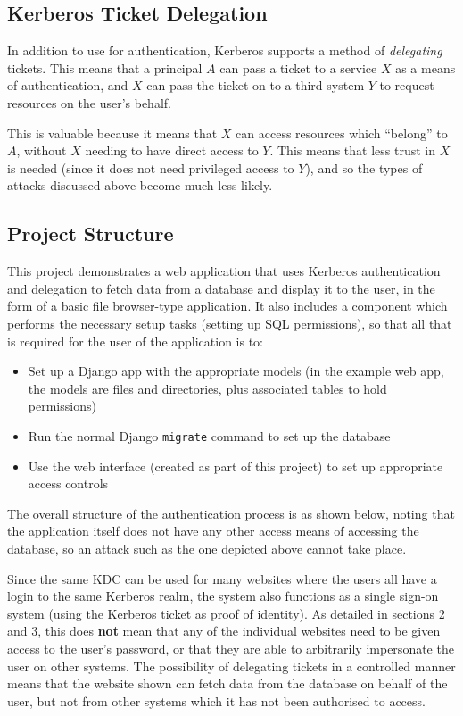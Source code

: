 \documentclass{article}
\begin{document}
\subsection{Kerberos Ticket Delegation}
In addition to use for authentication, Kerberos supports a method of \textit{delegating} tickets. This means that a principal $A$ can pass a ticket to a service $X$ as a means of authentication, and $X$ can pass the ticket on to a third system $Y$ to request resources on the user's behalf.

This is valuable because it means that $X$ can access resources which ``belong'' to $A$, without $X$ needing to have direct access to $Y$. This means that less trust in $X$ is needed (since it does not need privileged access to $Y$), and so the types of attacks discussed above become much less likely.

\subsection{Project Structure}
This project demonstrates a web application that uses Kerberos authentication and delegation to fetch data from a database and display it to the user, in the form of a basic file browser-type application. It also includes a component which performs the necessary setup tasks (setting up SQL permissions), so that all that is required for the user of the application is to:
\begin{itemize}
\item
  Set up a Django app with the appropriate models (in the example web app, the models are files and directories, plus associated tables to hold permissions)
\item
  Run the normal Django \texttt{migrate} command to set up the database
\item
  Use the web interface (created as part of this project) to set up appropriate access controls
\end{itemize}

The overall structure of the authentication process is as shown below, noting that the application itself does not have any other access means of accessing the database, so an attack such as the one depicted above cannot take place.

Since the same KDC can be used for many websites where the users all have a login to the same Kerberos realm, the system also functions as a single sign-on system (using the Kerberos ticket as proof of identity). As detailed in sections 2 and 3, this does \textbf{not} mean that any of the individual websites need to be given access to the user's password, or that they are able to arbitrarily impersonate the user on other systems. The possibility of delegating tickets in a controlled manner means that the website shown can fetch data from the database on behalf of the user, but not from other systems which it has not been authorised to access.
\end{document}
